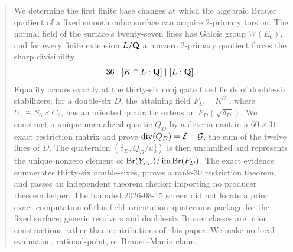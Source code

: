\begin{abstract}
We determine the first finite base changes at which the algebraic Brauer quotient
of a fixed smooth cubic surface can acquire 2-primary torsion.  The normal
field of the surface's twenty-seven lines has Galois group \(W(E_6)\), and for
every finite extension \(L/\Q\) a nonzero 2-primary quotient forces the sharp
divisibility
\[
  36\mid [K\cap L:\Q]\mid [L:\Q].
\]
Equality occurs exactly at the thirty-six conjugate fixed fields of
double-six stabilizers; for a double-six \(D\), the attaining field
\(F_D=K^{U_1}\), where \(U_1\cong S_6\times C_2\), has an oriented quadratic
extension
\(F_D(\sqrt{\delta_D})\).  We construct a unique normalized quartic \(Q_D\)
by a determinant in a \(60\times31\) exact restriction matrix and prove
\(\divv(Q_D)=\mathcal E+\mathcal G\), the sum of the twelve lines of \(D\).
The quaternion
\((\delta_D,Q_D/u_0^4)\) is then unramified and represents the unique nonzero
element of
\(\Br(Y_{F_D})/\operatorname{im}\Br(F_D)\).  The exact evidence enumerates
thirty-six double-sixes, proves a rank-\(30\) restriction theorem, and passes
an independent theorem checker importing no producer theorem helper.  The bounded 2026-08-15 screen did not
locate a prior exact computation of this field--orientation--quaternion
package for the fixed surface; generic resolvers and double-six Brauer
classes are prior constructions rather than contributions of this paper.  We make no local-evaluation,
rational-point, or Brauer--Manin claim.
\end{abstract}
